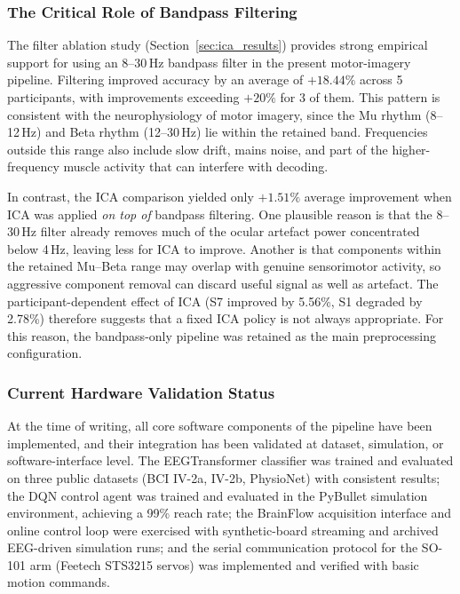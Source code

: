 \documentclass[12pt, a4paper]{article}
\begin{document}
\subsubsection{The Critical Role of Bandpass Filtering}

The filter ablation study (Section~\ref{sec:ica_results}) provides strong empirical support for using an 8--30\,Hz bandpass filter in the present motor-imagery pipeline. Filtering improved accuracy by an average of $+18.44\%$ across 5 participants, with improvements exceeding $+20\%$ for 3 of them. This pattern is consistent with the neurophysiology of motor imagery, since the Mu rhythm (8--12\,Hz) and Beta rhythm (12--30\,Hz) lie within the retained band. Frequencies outside this range also include slow drift, mains noise, and part of the higher-frequency muscle activity that can interfere with decoding.

In contrast, the ICA comparison yielded only $+1.51\%$ average improvement when ICA was applied \emph{on top of} bandpass filtering. One plausible reason is that the 8--30\,Hz filter already removes much of the ocular artefact power concentrated below 4\,Hz, leaving less for ICA to improve. Another is that components within the retained Mu--Beta range may overlap with genuine sensorimotor activity, so aggressive component removal can discard useful signal as well as artefact. The participant-dependent effect of ICA (S7 improved by 5.56\%, S1 degraded by 2.78\%) therefore suggests that a fixed ICA policy is not always appropriate. For this reason, the bandpass-only pipeline was retained as the main preprocessing configuration.

\subsubsection{Current Hardware Validation Status}

At the time of writing, all core software components of the pipeline have been implemented, and their integration has been validated at dataset, simulation, or software-interface level. The EEGTransformer classifier was trained and evaluated on three public datasets (BCI IV-2a, IV-2b, PhysioNet) with consistent results; the DQN control agent was trained and evaluated in the PyBullet simulation environment, achieving a 99\% reach rate; the BrainFlow acquisition interface and online control loop were exercised with synthetic-board streaming and archived EEG-driven simulation runs; and the serial communication protocol for the SO-101 arm (Feetech STS3215 servos) was implemented and verified with basic motion commands.
\end{document}
